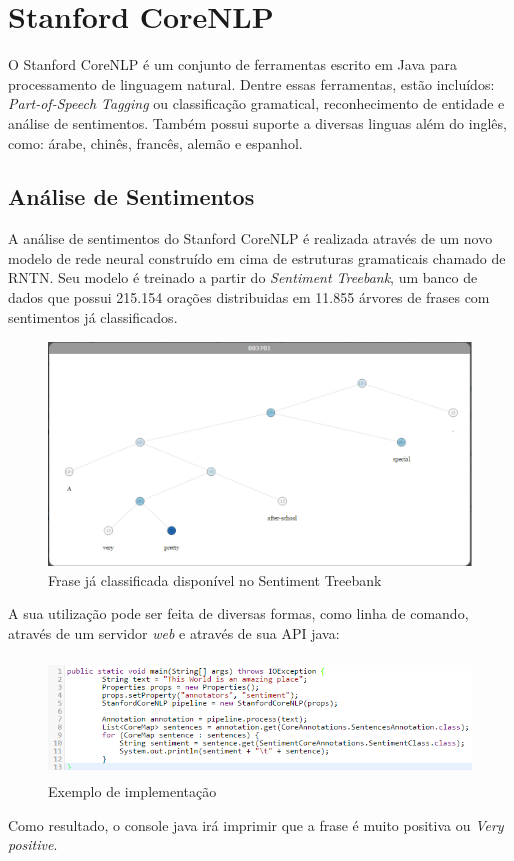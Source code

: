 \section{Stanford CoreNLP}

O Stanford CoreNLP é um conjunto de ferramentas escrito em Java para
processamento de linguagem natural. Dentre essas ferramentas, estão incluídos:
\textit{Part-of-Speech Tagging} ou classificação gramatical, reconhecimento de
entidade e análise de sentimentos. Também possui suporte a diversas linguas além
do inglês, como: árabe, chinês, francês, alemão e espanhol.

\subsection{Análise de Sentimentos}

A análise de sentimentos do Stanford CoreNLP é realizada através de um novo
modelo de rede neural construído em cima de estruturas gramaticais chamado de
\ac{RNTN}. Seu modelo é treinado a partir do \textit{Sentiment Treebank}, um
banco de dados que possui 215.154 orações distribuidas em 11.855 árvores de
frases com sentimentos já classificados.

\begin{figure}[htbp]
 \centering
 \includegraphics[height=225px]{imagens/corenlp.png}
 \caption{Frase já classificada disponível no Sentiment Treebank}
 \label{fig:corenlp}
\end{figure}

A sua utilização pode ser feita de diversas formas, como linha de comando,
através de um servidor \textit{web} e através de sua API java:


\begin{figure}[htbp]
 \centering
 \includegraphics[height=120px]{imagens/corenlp1.png}
 \caption{Exemplo de implementação}
 \label{fig:corenlp}
\end{figure}

Como resultado, o console java irá imprimir que a frase é muito positiva ou
\textit{Very positive}.

